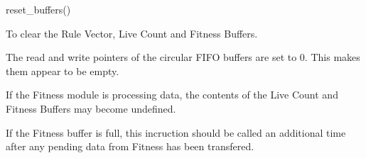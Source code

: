 

\format
reset\_buffers()

\purpose

To clear the Rule Vector, Live Count and Fitness Buffers.

\description

The read and write pointers of the circular FIFO buffers are set to 0.
This makes them appear to be empty.

\notes

If the Fitness module is processing data, the contents of the Live Count and Fitness Buffers may become undefined.

If the Fitness buffer is full, this incruction should be called an additional time after any pending data from Fitness has been transfered.
